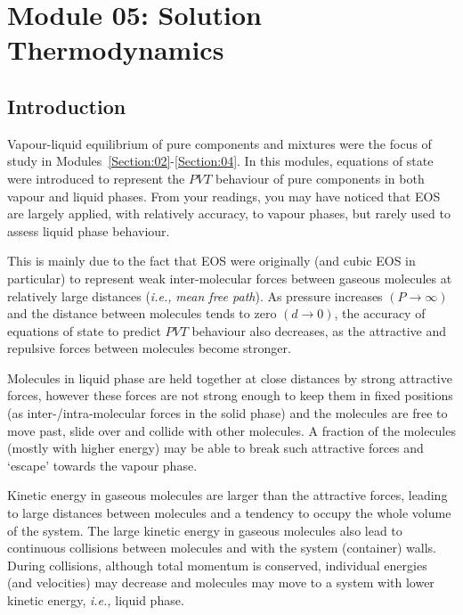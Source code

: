 \documentclass[12pts,a4paper,amsmath,amssymb,floatfix]{article}%
\newcommand{\ie}{{\it i.e., }}
\begin{document}
\section{Module 05: Solution Thermodynamics}\label{Section:05}

\subsection{Introduction}\label{Section:05:Introduction}
Vapour-liquid equilibrium of pure components and mixtures were the focus of study in Modules~\ref{Section:02}-\ref{Section:04}. In this modules, equations of state were introduced to represent the $PVT$ behaviour of pure components in both vapour and liquid phases. From your readings, you may have noticed that EOS are largely applied, with relatively accuracy, to vapour phases, but rarely used to assess liquid phase behaviour. 

This is mainly due to the fact that EOS were originally (and cubic EOS in particular) to represent weak inter-molecular forces between gaseous molecules at relatively large distances (\ie {\it mean free path}). As pressure increases $\left(P\rightarrow \infty\right)$ and the distance between molecules tends to zero $\left(d\rightarrow 0\right)$, the accuracy of equations of state to predict $PVT$ behaviour also decreases, as the attractive and repulsive forces between molecules become stronger. 

Molecules in liquid phase are held together at close distances by strong attractive forces, however these forces are not strong enough to keep them in fixed positions (as inter-/intra-molecular forces in the solid phase) and the molecules are free to move past, slide over and collide with other molecules. A fraction of the molecules (mostly with higher energy) may be able to break such attractive forces and `escape' towards the vapour phase. 

Kinetic energy in gaseous molecules are larger than the attractive forces, leading to large distances between molecules and a tendency to occupy the whole volume of the system. The large kinetic energy in gaseous molecules also lead to continuous collisions between molecules and with the system (container) walls. During collisions, although total momentum is conserved, individual energies (and velocities) may decrease and molecules may move to a system with lower kinetic energy, \ie liquid phase.

\bigskip
\end{document}
